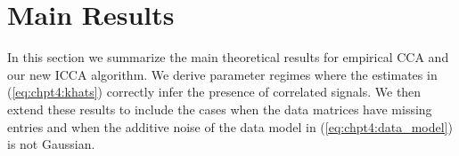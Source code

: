 \section{Main Results}\label{sec:chpt4:cca_theory}

In this section we summarize the main theoretical results for empirical CCA and our new
ICCA algorithm. We derive parameter regimes where the estimates in (\ref{eq:chpt4:khats})
correctly infer the presence of correlated signals. We then extend these
results to include the cases when the data matrices have missing entries and when the
additive noise of the data model in (\ref{eq:chpt4:data_model}) is not Gaussian.

